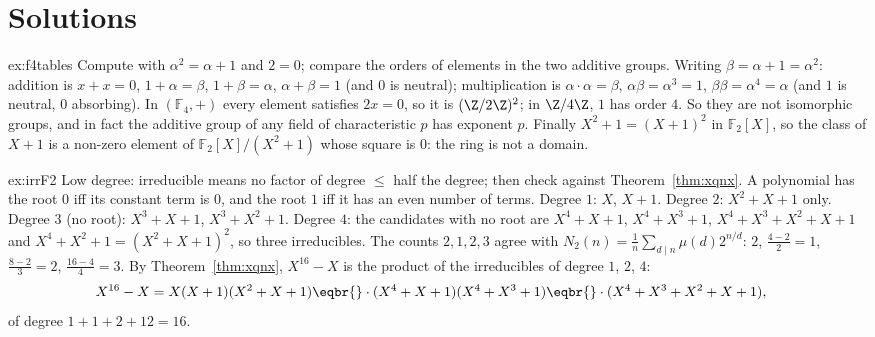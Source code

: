 \section{Solutions}

\begin{solution}{ex:f4tables}
\idea Compute with $\alpha^2=\alpha+1$ and $2=0$; compare the orders of elements in the two additive groups.
\writeup Writing $\beta=\alpha+1=\alpha^2$: addition is $x+x=0$, $1+\alpha=\beta$, $1+\beta=\alpha$, $\alpha+\beta=1$ (and $0$ is neutral); multiplication is $\alpha\cdot\alpha=\beta$, $\alpha\beta=\alpha^3=1$, $\beta\beta=\alpha^4=\alpha$ (and $1$ is neutral, $0$ absorbing). In $(\mathbb F_4,+)$ every element satisfies $2x=0$, so it is $(\Z/2\Z)^2$; in $\Z/4\Z$, $1$ has order $4$. So they are not isomorphic groups, and in fact the additive group of any field of characteristic $p$ has exponent $p$. Finally $X^2+1=(X+1)^2$ in $\mathbb F_2[X]$, so the class of $X+1$ is a non-zero element of $\mathbb F_2[X]/(X^2+1)$ whose square is $0$: the ring is not a domain.
\end{solution}

\begin{solution}{ex:irrF2}
\idea Low degree: irreducible means no factor of degree $\le$ half the degree; then check against Theorem~\ref{thm:xqnx}.
\writeup A polynomial has the root $0$ iff its constant term is $0$, and the root $1$ iff it has an even number of terms. Degree $1$: $X$, $X+1$. Degree $2$: $X^2+X+1$ only. Degree $3$ (no root): $X^3+X+1$, $X^3+X^2+1$. Degree $4$: the candidates with no root are $X^4+X+1$, $X^4+X^3+1$, $X^4+X^3+X^2+X+1$ and $X^4+X^2+1=(X^2+X+1)^2$, so three irreducibles. The counts $2,1,2,3$ agree with $N_2(n)=\frac1n\sum_{d\mid n}\mu(d)2^{n/d}$: $2$, $\frac{4-2}2=1$, $\frac{8-2}3=2$, $\frac{16-4}4=3$. By Theorem~\ref{thm:xqnx}, $X^{16}-X$ is the product of the irreducibles of degree $1$, $2$, $4$:
\[
\begin{aligned}
X^{16}-X&=X(X+1)(X^2+X+1)\eqbr{}\cdot(X^4+X+1)(X^4+X^3+1)\eqbr{}\cdot(X^4+X^3+X^2+X+1),
\end{aligned}
\]
of degree $1+1+2+12=16$.
\end{solution}

